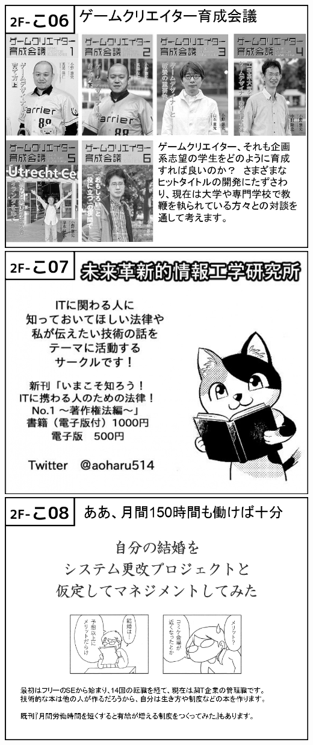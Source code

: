 \begin{center}
\includegraphics[width=0.9\linewidth]{images/circle-appeals/2F-こ06.jpg}
\includegraphics[width=0.9\linewidth]{images/circle-appeals/2F-こ07.jpg}
\includegraphics[width=0.9\linewidth]{images/circle-appeals/2F-こ08.jpg}

\end{center}
